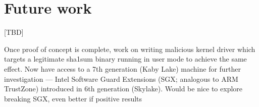\section{Future work}

[TBD]

Once proof of concept is complete, work on writing malicious kernel driver
which targets a legitimate sha1sum binary running in user mode to achieve the
same effect.
Now have access to a 7th generation (Kaby Lake) machine for further
investigation — Intel Software Guard Extensions (SGX; analogous to ARM
TrustZone) introduced in 6th generation (Skylake).
Would be nice to explore breaking SGX, even better if positive results
